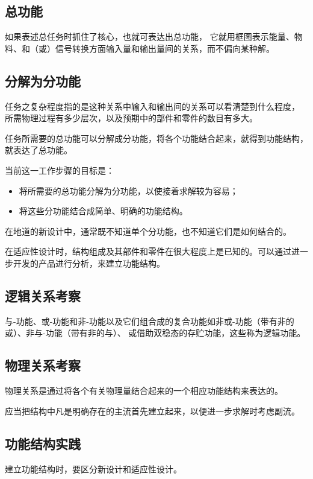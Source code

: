 \documentclass[letterpaper,10pt,english]{sphinxmanual}
\begin{document}
\subsection{总功能}
\label{unit5:id8}
如果表述总任务时抓住了核心，也就可表达出总功能，
它就用框图表示能量、物料、和（或）信号转换方面输入量和输出量间的关系，而不偏向某种解。


\subsection{分解为分功能}
\label{unit5:id9}
任务之复杂程度指的是这种关系中输入和输出间的关系可以看清楚到什么程度，
所需物理过程有多少层次，以及预期中的部件和零件的数目有多大。

任务所需要的总功能可以分解成分功能，将各个功能结合起来，就得到功能结构，就表达了总功能。

当前这一工作步骤的目标是：
\begin{itemize}
\item {} 
将所需要的总功能分解为分功能，以使接着求解较为容易；

\item {} 
将这些分功能结合成简单、明确的功能结构。

\end{itemize}

在地道的新设计中，通常既不知道单个分功能，也不知道它们是如何结合的。

在适应性设计时，结构组成及其部件和零件在很大程度上是已知的。可以通过进一步开发的产品进行分析，来建立功能结构。


\subsection{逻辑关系考察}
\label{unit5:id10}
与-功能、或-功能和非-功能以及它们组合成的复合功能如非或-功能（带有非的或）、非与-功能（带有非的与）、
或借助双稳态的存贮功能，这些称为逻辑功能。


\subsection{物理关系考察}
\label{unit5:id11}
物理关系是通过将各个有关物理量结合起来的一个相应功能结构来表达的。

应当把结构中凡是明确存在的主流首先建立起来，以便进一步求解时考虑副流。


\subsection{功能结构实践}
\label{unit5:id12}
建立功能结构时，要区分新设计和适应性设计。
\end{document}
